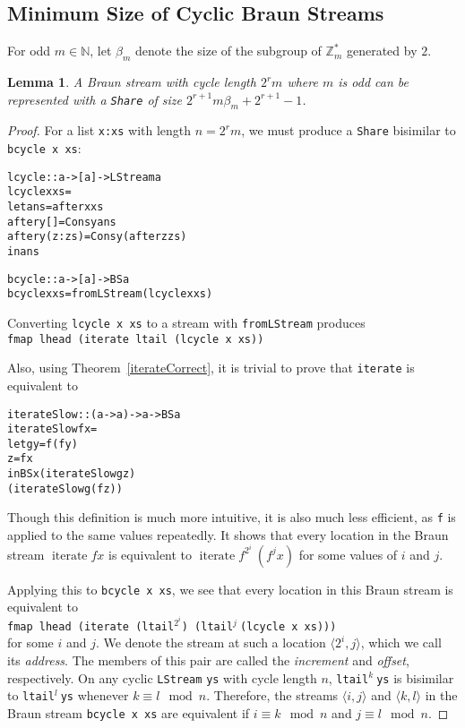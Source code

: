 \documentclass[envcountsect]{llncs}
\DeclareMathOperator{\iter}{iterate}
\newcommand{\share}{{\tt Share} }
\newtheorem{lemma}[theorem]{Lemma}
\begin{document}
\subsection{Minimum Size of Cyclic Braun Streams}

For odd $m \in \mathbb{N}$, let $\beta_m$ denote the size of the subgroup of $\mathbb{Z}_m^*$ generated by $2$.
\begin{lemma}
\label{cycleSize}
A Braun stream with cycle length $2^r m$ where $m$ is odd can be represented with a \share of size $2^{r+1} m \beta_m + 2^{r+1} - 1$.
\end{lemma}
\begin{proof}
For a list {\tt x:xs} with length $n = 2^r m$, we must produce a \share bisimilar to {\tt bcycle x xs}:

\begin{alltt}
lcycle :: a -> [a] -> LStream a
lcycle x xs = 
  let ans = after x xs
      after y [] = Cons y ans
      after y (z:zs) = Cons y (after z zs)
  in ans

bcycle :: a -> [a] -> BS a
bcycle x xs = fromLStream (lcycle x xs)
\end{alltt}

Converting {\tt lcycle x xs} to a stream with {\tt fromLStream} produces 
\\
{\tt fmap lhead (iterate ltail (lcycle x xs))}

Also, using Theorem~\ref{iterateCorrect}, it is trivial to prove that {\tt iterate} is equivalent to

\begin{alltt}
iterateSlow :: (a -> a) -> a -> BS a
iterateSlow f x =
  let g y = f (f y)
      z = f x
  in BS x (iterateSlow g    z) 
          (iterateSlow g (f z))
\end{alltt}

Though this definition is much more intuitive, it is also much less efficient, as {\tt f} is applied to the same values repeatedly.
It shows that every location in the Braun stream $\iter f x$ is equivalent to $\iter f^{2^i}\ (f^j x)$ for some values of $i$ and $j$.

Applying this to {\tt bcycle x xs}, we see that every location in this Braun stream is equivalent to 
\\
{\tt fmap lhead (iterate (ltail}$^{2^i}${\tt ) (ltail}$^j\ ${\tt (lcycle x xs)))} 
\\
for some $i$ and $j$.
We denote the stream at such a location $\langle 2^i,j \rangle$, which we call its {\em address}.
The members of this pair are called the {\em increment} and {\em offset}, respectively.
On any cyclic {\tt LStream} {\tt ys} with cycle length $n$, {\tt ltail}$^k\ ${\tt ys} is bisimilar to {\tt ltail}$^l\ ${\tt ys} whenever $k \equiv l \mod n$.
Therefore, the streams $\langle i,j \rangle$ and $\langle k,l \rangle$ in the Braun stream {\tt bcycle x xs} are equivalent if $i \equiv k \mod n$ and $j \equiv l \mod n$.


\end{proof}
\end{document}
